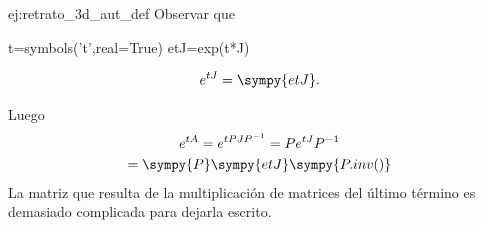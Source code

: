 \begin{ejemplo}{ej:retrato_3d_aut_def}
 Observar que
 \begin{sympycode}
t=symbols('t',real=True)
etJ=exp(t*J)
 \end{sympycode}

 
 \[
  e^{tJ}=\sympy{etJ}.
 \]

 Luego
{\small
 \begin{multline*}
  e^{tA}=e^{tPJP^{-1}}=Pe^{tJ}P^{-1}\\
  =\sympy{P}\sympy{etJ}\sympy{P.inv()}\\
 \end{multline*}
 }
La matriz que resulta de la multiplicación de matrices del último término es demasiado complicada para dejarla escrito. 

 
\end{ejemplo}


 
 
